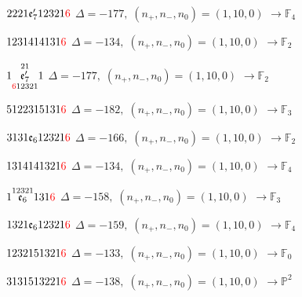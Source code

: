 \documentclass[10pt]{article}
\begin{document}
\smallskip

$2221\mathfrak{e}_7'12321\textcolor{red}{6}$ \quad $\Delta=-177,\; (n_+,n_-,n_0)=(1,10,0)$ \quad $\to \mathbb{F}_{4}$

\smallskip

$1231414131\textcolor{red}{6}$ \quad $\Delta=-134,\; (n_+,n_-,n_0)=(1,10,0)$ \quad $\to \mathbb{F}_{2}$

\smallskip

$1\overset{21}{\underset{\textcolor{red}{6}12321}{\mathfrak{e}_7'}}1$ \quad $\Delta=-177,\; (n_+,n_-,n_0)=(1,10,0)$ \quad $\to \mathbb{F}_{2}$

\smallskip

$5122315131\textcolor{red}{6}$ \quad $\Delta=-182,\; (n_+,n_-,n_0)=(1,10,0)$ \quad $\to \mathbb{F}_{3}$

\smallskip

$3131\mathfrak{e}_612321\textcolor{red}{6}$ \quad $\Delta=-166,\; (n_+,n_-,n_0)=(1,10,0)$ \quad $\to \mathbb{F}_{2}$

\smallskip

$1314141321\textcolor{red}{6}$ \quad $\Delta=-134,\; (n_+,n_-,n_0)=(1,10,0)$ \quad $\to \mathbb{F}_{4}$

\smallskip

$1\overset{12321}{\mathfrak{e}_6}131\textcolor{red}{6}$ \quad $\Delta=-158,\; (n_+,n_-,n_0)=(1,10,0)$ \quad $\to \mathbb{F}_{3}$

\smallskip

$1321\mathfrak{e}_612321\textcolor{red}{6}$ \quad $\Delta=-159,\; (n_+,n_-,n_0)=(1,10,0)$ \quad $\to \mathbb{F}_{4}$

\smallskip

$1232151321\textcolor{red}{6}$ \quad $\Delta=-133,\; (n_+,n_-,n_0)=(1,10,0)$ \quad $\to \mathbb{F}_{0}$

\smallskip

$3131513221\textcolor{red}{6}$ \quad $\Delta=-138,\; (n_+,n_-,n_0)=(1,10,0)$ \quad $\to \mathbb{P}^2$
\end{document}

